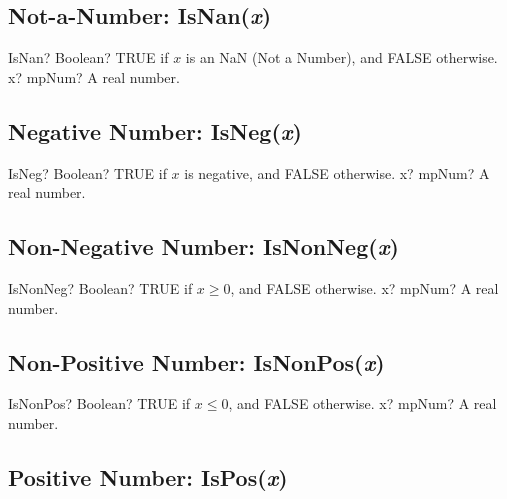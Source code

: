 \subsection{Not-a-Number: IsNan(\textit{x})}

\begin{mpFunctionsExtract}
	\mpFunctionOne
	{IsNan? Boolean? TRUE if $x$ is an NaN (Not a Number), and FALSE otherwise.}
	{x? mpNum? A real number.}
\end{mpFunctionsExtract}




\subsection{Negative Number: IsNeg(\textit{x})}

\begin{mpFunctionsExtract}
	\mpFunctionOne
	{IsNeg? Boolean? TRUE if $x$ is negative, and FALSE otherwise.}
	{x? mpNum? A real number.}
\end{mpFunctionsExtract}




\subsection{Non-Negative Number: IsNonNeg(\textit{x})}

\begin{mpFunctionsExtract}
	\mpFunctionOne
	{IsNonNeg? Boolean? TRUE if $x \geq 0$, and FALSE otherwise.}
	{x? mpNum? A real number.}
\end{mpFunctionsExtract}




\subsection{Non-Positive Number: IsNonPos(\textit{x})}

\begin{mpFunctionsExtract}
	\mpFunctionOne
	{IsNonPos? Boolean? TRUE if $x \leq 0$, and FALSE otherwise.}
	{x? mpNum? A real number.}
\end{mpFunctionsExtract}






\subsection{Positive Number: IsPos(\textit{x})}

